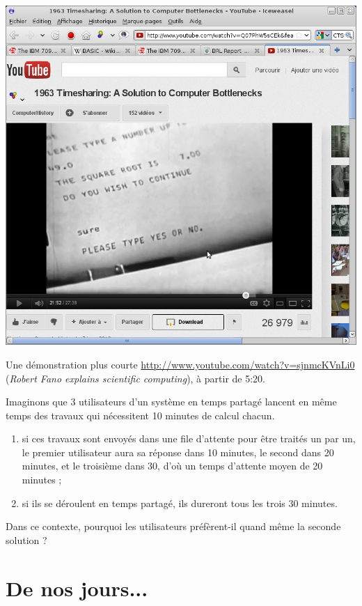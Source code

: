 \begin{multicols}{2}
\begin{center}
\includegraphics[width=\linewidth]{Videos/corbato-demo.png}
\end{center}


Une démonstration plus courte \url{http://www.youtube.com/watch?v=sjnmcKVnLi0}
 (\emph{Robert Fano explains scientific computing}), à partir de 5:20.



\begin{exercice} Imaginons que 3 utilisateurs d'un système en temps partagé lancent en même
temps des travaux qui nécessitent 10 minutes de calcul chacun.
\begin{enumerate}
\item si ces travaux sont envoyés dans une file d'attente pour être
  traités un par un, le premier utilisateur aura sa réponse dans 10
  minutes, le second dans 20 minutes, et le troisième dans 30, d'où
  un temps d'attente moyen de 20 minutes ;
\item si ils se déroulent en temps partagé, ils dureront tous les trois 30 minutes.
\end{enumerate}
Dans ce contexte, pourquoi les utilisateurs préfèrent-il quand même 
la seconde solution ?
\end{exercice}

\section{De nos jours... }



\end{multicols}
